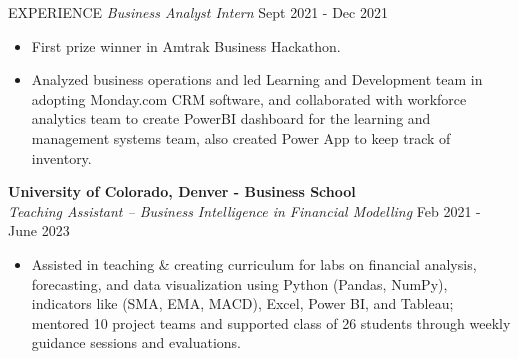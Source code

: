 \documentclass{resume} %
\begin{document}
\begin{rSection}{EXPERIENCE}
\vspace{-13pt}
\textit{{Business Analyst Intern}} \hfill{Sept 2021 - Dec 2021}
\vspace{-4pt}
\begin{itemize}
\itemsep -2.5pt {} 
\item First prize winner in Amtrak Business Hackathon.
\item Analyzed business operations and led Learning and Development team in adopting Monday.com CRM software, and collaborated with workforce analytics team to create PowerBI dashboard for the learning and management systems
team, also created Power App to keep track of inventory.
\end{itemize}
 
\textbf{University of Colorado, Denver - Business School}\\
\textit{{Teaching Assistant – Business Intelligence in Financial Modelling}} \hfill{Feb 2021 - June 2023} \\
\vspace{-15pt}
\begin{itemize} 
\itemsep -2pt {}
\item Assisted in teaching \& creating curriculum for labs on financial analysis, forecasting, and data visualization using Python (Pandas, NumPy), indicators like (SMA, EMA, MACD), Excel, Power BI, and Tableau; mentored 10 project teams and supported class of 26 students through weekly guidance sessions and evaluations.

 \end{itemize}
 

\end{rSection} 
\end{document}
